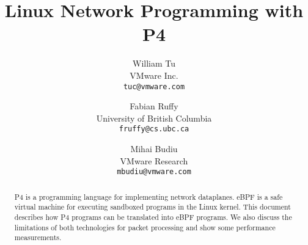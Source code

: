 \documentclass[9pt,twocolumn,times]{article}
\title{Linux Network Programming with P4}
\author{William Tu\\
  VMware Inc.\\
  \texttt{tuc@vmware.com}
  \and
  Fabian Ruffy\\
  University of British Columbia\\
  \texttt{fruffy@cs.ubc.ca}
  \and
  Mihai Budiu\\
  VMware Research\\
  \texttt{mbudiu@vmware.com}
}
\date{}
\begin{document}
\maketitle

\begin{abstract}
  P4 is a programming language for implementing network dataplanes.
  eBPF is a safe virtual machine for executing sandboxed programs in
  the Linux kernel.  This document describes how P4 programs can be
  translated into eBPF programs.  We also discuss the limitations of
  both technologies for packet processing and show some performance
  measurements.
\end{abstract}










\end{document}
